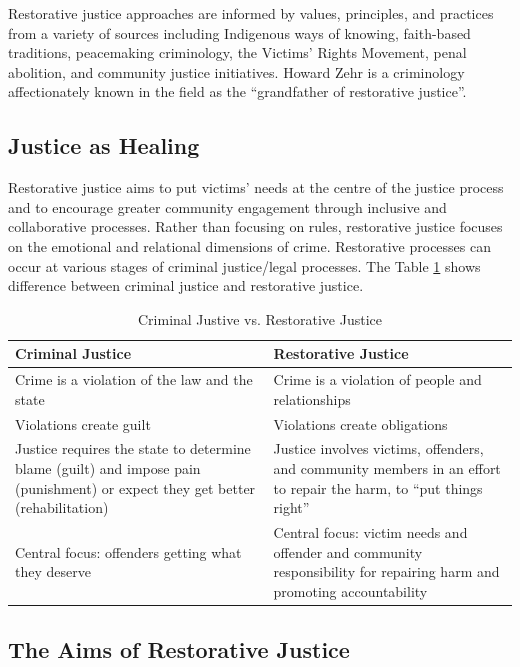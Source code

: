 \documentclass{article}
\begin{document}
Restorative justice approaches are informed by values, principles, and practices from a variety of sources including Indigenous ways of knowing, faith-based traditions, peacemaking criminology, the Victims’ Rights Movement, penal abolition, and community justice initiatives. Howard Zehr is a criminology affectionately known in the field as the “grandfather of restorative justice”.

\subsection{Justice as Healing}

Restorative justice aims to put victims’ needs at the centre of the justice process and to encourage greater community engagement through inclusive and collaborative processes. Rather than focusing on rules, restorative justice focuses on the emotional and relational dimensions of crime. Restorative processes can occur at various stages of criminal justice/legal processes. The Table \ref{criminalJ_restorativeJ} shows difference between criminal justice and restorative justice.

\begin{table}
    \centering
    \begin{tabular}{|p{7.5cm}|p{7.5cm}|}
        \hline
        \textbf{Criminal Justice} & \textbf{Restorative Justice} \\
        \hline
        Crime is a violation of the law and the state & Crime is a violation of people and relationships \\
        \hline
        Violations create guilt &  Violations create obligations \\
        \hline
        Justice requires the state to determine blame (guilt) and impose pain (punishment) or expect they get better (rehabilitation) & Justice involves victims, offenders, and community members in an effort to repair the harm, to “put things right” \\
        \hline
        Central focus: offenders getting what they deserve & Central focus: victim needs and offender and community responsibility for repairing harm and promoting accountability \\
        \hline
    \end{tabular}
    \caption{Criminal Justive vs. Restorative Justice}
    \label{criminalJ_restorativeJ}
\end{table}

\subsection{The Aims of Restorative Justice}
\end{document}
